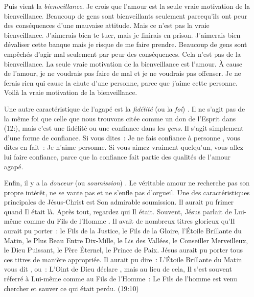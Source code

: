 Puis vient la \emph{bienveillance}. Je crois que l'amour est la seule
 vraie motivation de la bienveillance.
 Beaucoup de gens sont bienveillants seulement parcequ'ils ont peur
 des conséquences d'une mauvaise attitude.
 Mais ce n'est pas la vraie bienveillance.
 \Og J'aimerais bien te tuer, mais je finirais en prison.
 \ocadr J'aimerais bien dévaliser cette banque mais je risque
 de me faire prendre. \Fg{}
 Beaucoup de gens sont empêchés d'agir mal seulement par peur
 des conséquences. Cela n'est pas de la bienveillance.
 La seule vraie motivation de la bienveillance est l'amour.
 À cause de l'amour, je ne voudrais pas faire de mal
 et je ne voudrais pas offenser. Je ne ferais rien qui cause
 la chute d'une personne, parce que j'aime cette personne.
 Voilà la vraie motivation de la bienveillance.

Une autre caractéristique de l'agapé est la \emph{fidélité}
 (ou la \emph{foi})
 .
 Il ne s'agit pas de la même foi que celle que nous trouvons citée
 comme un don de l'Esprit dans (12:),
 mais c'est une fidélité ou une confiance dans les \emph{gens}.
 Il s'agit simplement d'une forme de confiance. Si vous dites~:
 \Og Je ne fais confiance à personne \Fg{}, vous dites en fait~:
 \Og Je n'aime personne. \Fg{}
 Si vous aimez vraiment quelqu'un, vous allez lui faire confiance,
 parce que la confiance fait partie des qualités de l'amour agapé.

Enfin, il y a la \emph{douceur} (ou \emph{soumission})
 .
 Le véritable amour ne recherche pas son propre intérêt,
 ne se vante pas et ne s'enfle pas d'orgueil.
 Une des caractéristiques principales de Jésus-Christ
 est Son admirable soumission. Il aurait pu frimer quand Il était là.
 Après tout, regardez qui Il était. Souvent, Jésus parlait de Lui-même
 comme du \Og Fils de l'Homme \Fg{}.
 Il avait de nombreux titres glorieux qu'Il aurait pu porter~:
 le Fils de la Justice, le Fils de la Gloire, l'Étoile Brillante du Matin,
 le Plus Beau Entre Dix-Mille, le Lis des Vallées,
 le Conseiller Merveilleux, le Dieu Puissant, le Père Éternel,
 le Prince de Paix. Jésus aurait pu porter tous ces titres
 de manière appropriée. Il aurait pu dire~:
 \Og L'Étoile Brillante du Matin vous dit \Fg{}, ou~:
 \Og L'Oint de Dieu déclare \Fg{}, mais au lieu de cela,
 Il s'est souvent réferré à Lui-même comme au Fils de l'Homme~:
 \Og Le Fils de l'homme est venu chercher et sauver
 ce qui était perdu. \Fg{} (19:10)


